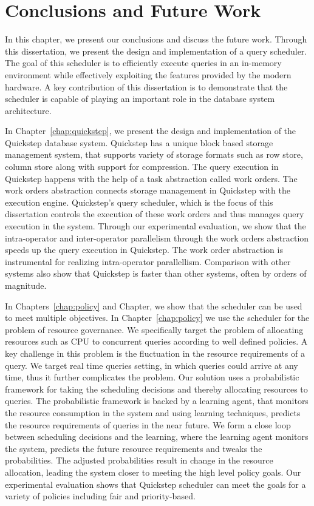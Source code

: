 \chapter{Conclusions and Future Work}
In this chapter, we present our conclusions and discuss the future work.
Through this dissertation, we present the design and implementation of a query scheduler.
The goal of this scheduler is to efficiently execute queries in an in-memory environment while effectively exploiting the features provided by the modern hardware. 
A key contribution of this dissertation is to demonstrate that the scheduler is capable of playing an important role in the database system architecture.

In Chapter~\ref{chap:quickstep}, we present the design and implementation of the Quickstep database system. 
Quickstep has a unique block based storage management system, that supports variety of storage formats such as row store, column store along with support for compression. 
The query execution in Quickstep happens with the help of a task abstraction called work orders. 
The work orders abstraction connects storage management in Quickstep with the execution engine. 
Quickstep's query scheduler, which is the focus of this dissertation controls the execution of these work orders and thus manages query execution in the system. 
Through our experimental evaluation, we show that the intra-operator and inter-operator parallelism through the work orders abstraction speeds up the query execution in Quickstep.
The work order abstraction is instrumental for realizing intra-operator parallellism.
Comparison with other systems also show that Quickstep is faster than other systems, often by orders of magnitude. 

In Chapters~\ref{chap:policy} and Chapter, we show that the scheduler can be used to meet multiple objectives.
In Chapter~\ref{chap:policy} we use the scheduler for the problem of resource governance.
We specifically target the problem of allocating resources such as CPU to concurrent queries according to well defined policies.
A key challenge in this problem is the fluctuation in the resource requirements of a query.
We target real time queries setting, in which queries could arrive at any time, thus it further complicates the problem.
Our solution uses a probabilistic framework for taking the scheduling decisions and thereby allocating resources to queries.
The probabilistic framework is backed by a learning agent, that monitors the resource consumption in the system and using learning techniques, predicts the resource requirements of queries in the near future.  
We form a close loop between scheduling decisions and the learning, where the learning agent monitors the system, predicts the future resource requirements and tweaks the probabilities. 
The adjusted probabilities result in change in the resource allocation, leading the system closer to meeting the high level policy goals.
Our experimental evaluation shows that Quickstep scheduler can meet the goals for a variety of policies including fair and priority-based. 


